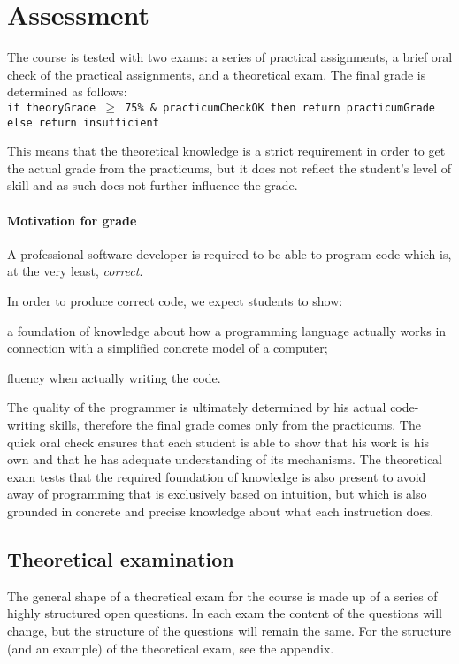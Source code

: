 \section{Assessment}
	The course is tested with two exams: a series of practical assignments, a brief oral check of the practical assignments, and a theoretical exam. The final grade is determined as follows: \\

	\texttt{if theoryGrade $\geq$ 75\% \& practicumCheckOK then return practicumGrade else return insufficient}

	This means that the theoretical knowledge is a strict requirement in order to get the actual grade from the practicums, but it does not reflect the student's level of skill and as such does not further influence the grade.

	\paragraph*{Motivation for grade}
		A professional software developer is required to be able to program code which is, at the very least, \textit{correct}.

		In order to produce correct code, we expect students to show:
		\begin{inparaenum}
			\item a foundation of knowledge about how a programming language actually works in connection with a simplified concrete model of a computer;
			\item fluency when actually writing the code.
		\end{inparaenum}

		The quality of the programmer is ultimately determined by his actual code-writing skills, therefore the final grade comes only from the practicums. The quick oral check ensures that each student is able to show that his work is his own and that he has adequate understanding of its mechanisms. The theoretical exam tests that the required foundation of knowledge is also present to avoid away of programming that is exclusively based on intuition, but which is also grounded in concrete and precise knowledge about what each instruction does.


	\subsection{Theoretical examination}
		The general shape of a theoretical exam for the course is made up of a series of highly structured open questions. In each exam the content of the questions will change, but the structure of the questions will remain the same. For the structure (and an example) of the theoretical exam, see the appendix.


